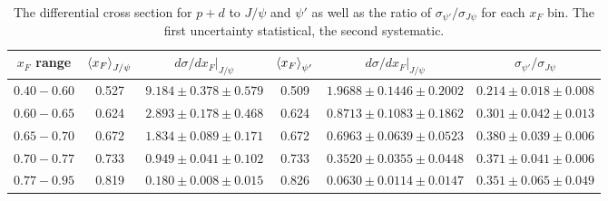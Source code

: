 \documentclass[reprint,aps,unsortedaddress,superscriptaddress,prd,floatfix,showpacs,linenumbers]{revtex4-2}
\begin{document}
\begin{table}[ht]
	\caption{The differential cross section for $p+d$ to $J/\psi$ and $\psi'$  as well as the ratio of
		$\sigma_{\psi'}/\sigma_{J\psi}$ for each $x_F$ bin. The first uncertainty  statistical, the second systematic. }
	\label{tab:pd_cs_xF}
	\begin{tabular}{c|ccccc}
		\hline
		$x_F$ range & $\expval{x_F}_{J/\psi}$ & $\left.d\sigma/dx_F\right|_{J/\psi}$ & $\expval{x_F}_{\psi'}$ & $\left.d\sigma/dx_F\right|_{J/\psi}$ & $\sigma_{\psi'}/\sigma_{J\psi}$ \\ \hline
		$0.40-0.60$ & 0.527                   & $9.184\pm0.378\pm0.579$              & 0.509                  & $1.9688\pm0.1446\pm0.2002$           & $0.214\pm0.018\pm0.008$         \\
		$0.60-0.65$ & 0.624                   & $2.893\pm0.178\pm0.468$              & 0.624                  & $0.8713\pm0.1083\pm0.1862$           & $0.301\pm0.042\pm0.013$         \\
		$0.65-0.70$ & 0.672                   & $1.834\pm0.089\pm0.171$              & 0.672                  & $0.6963\pm0.0639\pm0.0523$           & $0.380\pm0.039\pm0.006$         \\
		$0.70-0.77$ & 0.733                   & $0.949\pm0.041\pm0.102$              & 0.733                  & $0.3520\pm0.0355\pm0.0448$           & $0.371\pm0.041\pm0.006$         \\
		$0.77-0.95$ & 0.819                   & $0.180\pm0.008\pm0.015$              & 0.826                  & $0.0630\pm0.0114\pm0.0147$           & $0.351\pm0.065\pm0.049$         \\ \hline
	\end{tabular}
\end{table}
\end{document}
